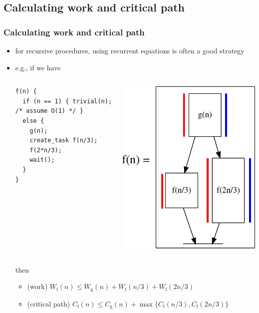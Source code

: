 \documentclass[12pt,dvipdfmx]{beamer}
\newcommand{\ao}[1]{{\color{blue}#1}}
\newcommand{\aka}[1]{{\color{red}#1}}
\begin{document}
\subsection{Calculating work and critical path}
\begin{frame}[fragile]
\frametitle{Calculating work and critical
  path}

\begin{itemize}
\item for recursive procedures, 
  using recurrent equations is often a good
  strategy
\item e.g., if we have
  \begin{columns}
    \begin{column}{0.6\textwidth}
\begin{lstlisting}
f(n) {
  if (n == 1) { trivial(n); /* assume O(1) */ }
  else {
    g(n);
    create_task f(n/3);
    f(2*n/3);
    wait();
  }
}    
\end{lstlisting}
    \end{column}
    \begin{column}{0.3\textwidth}
\begin{center}
\includegraphics[width=\textwidth]{out/pdf/svg/dag_f.pdf}  
\end{center}
    \end{column}
  \end{columns}
then
\begin{itemize}
\item (work)
\aka{$W_{\mbox{f}}(n) \leq W_{\mbox{g}}(n) + W_{\mbox{f}}(n/3) + W_{\mbox{f}}(2n/3)$}
\item (critical path)
\ao{$C_{\mbox{f}}(n) \leq C_{\mbox{g}}(n) + \max \{ C_{\mbox{f}}(n/3), C_{\mbox{f}}(2n/3) \}$}
\end{itemize}


\end{itemize}
\end{frame}
\end{document}

